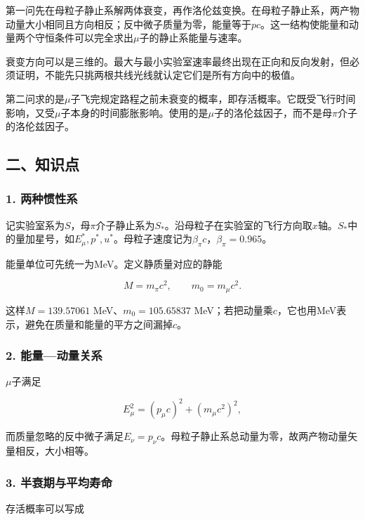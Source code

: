 \documentclass[12pt,a4paper,fontset=fandol]{ctexart}
\begin{document}
第一问先在母粒子静止系解两体衰变，再作洛伦兹变换。在母粒子静止系，两产物动量大小相同且方向相反；反中微子质量为零，能量等于\(pc\)。这一结构使能量和动量两个守恒条件可以完全求出\(\mu\)子的静止系能量与速率。

衰变方向可以是三维的。最大与最小实验室速率最终出现在正向和反向发射，但必须证明，不能先只挑两根共线光线就认定它们是所有方向中的极值。

第二问求的是\(\mu\)子飞完规定路程之前未衰变的概率，即存活概率。它既受飞行时间影响，又受\(\mu\)子本身的时间膨胀影响。使用的是\(\mu\)子的洛伦兹因子，而不是母\(\pi\)介子的洛伦兹因子。

\subsection{二、知识点}\label{ux4e8cux77e5ux8bc6ux70b9-5}

\subsubsection{1. 两种惯性系}\label{ux4e24ux79cdux60efux6027ux7cfb}

记实验室系为\(S\)，母\(\pi\)介子静止系为\(S_*\)。沿母粒子在实验室的飞行方向取\(x\)轴。\(S_*\)中的量加星号，如\(E_\mu^*,p^*,u^*\)。母粒子速度记为\(\beta_\pi c\)，\(\beta_\pi=0.965\)。

能量单位可先统一为MeV。定义静质量对应的静能

\[
M=m_\pi c^2,\qquad m_0=m_\mu c^2.
\]

这样\(M=139.57061\) MeV、\(m_0=105.65837\)
MeV；若把动量乘\(c\)，它也用MeV表示，避免在质量和能量的平方之间漏掉\(c\)。

\subsubsection{2.
能量---动量关系}\label{ux80fdux91cfux52a8ux91cfux5173ux7cfb}

\(\mu\)子满足

\[
E_\mu^2=(p_\mu c)^2+(m_\mu c^2)^2,
\]

而质量忽略的反中微子满足\(E_\nu=p_\nu c\)。母粒子静止系总动量为零，故两产物动量矢量相反，大小相等。

\subsubsection{3.
半衰期与平均寿命}\label{ux534aux8870ux671fux4e0eux5e73ux5747ux5bffux547d}

存活概率可以写成
\end{document}
